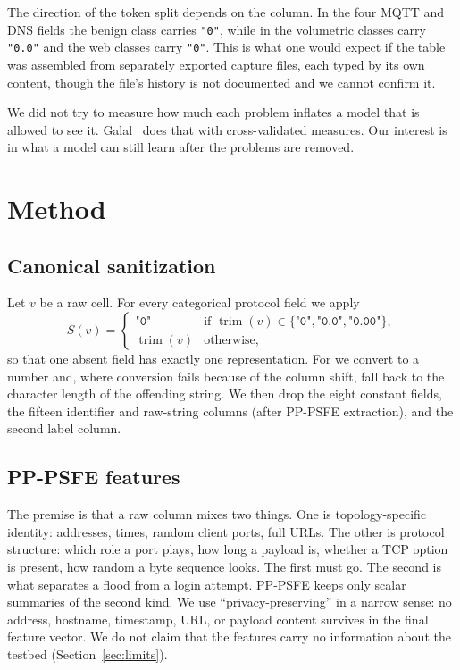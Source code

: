 \documentclass[journal]{IEEEtran}
\newcommand{\feat}[1]{\texttt{\detokenize{#1}}}
\newcommand{\zero}{\texttt{"0"}}
\newcommand{\zerof}{\texttt{"0.0"}}
\begin{document}
The direction of the token split depends on the column. In the four MQTT and DNS fields the benign class carries \zero{}, while in \feat{http.request.method} the volumetric classes carry \zerof{} and the web classes carry \zero{}. This is what one would expect if the table was assembled from separately exported capture files, each typed by its own content, though the file's history is not documented and we cannot confirm it.

We did not try to measure how much each problem inflates a model that is allowed to see it. Galal~\cite{galal2026} does that with cross-validated measures. Our interest is in what a model can still learn after the problems are removed.

\section{Method}\label{sec:method}
\subsection{Canonical sanitization}
Let $v$ be a raw cell. For every categorical protocol field we apply
\begin{equation}
S(v)=\begin{cases}\texttt{"0"} & \text{if } \operatorname{trim}(v)\in\{\texttt{"0"},\texttt{"0.0"},\texttt{"0.00"}\},\\ \operatorname{trim}(v) & \text{otherwise,}\end{cases}
\label{eq:canon}
\end{equation}
so that one absent field has exactly one representation. For \feat{dns.qry.name.len} we convert to a number and, where conversion fails because of the column shift, fall back to the character length of the offending string. We then drop the eight constant fields, the fifteen identifier and raw-string columns (after PP-PSFE extraction), and the second label column.

\subsection{PP-PSFE features}
The premise is that a raw column mixes two things. One is topology-specific identity: addresses, times, random client ports, full URLs. The other is protocol structure: which role a port plays, how long a payload is, whether a TCP option is present, how random a byte sequence looks. The first must go. The second is what separates a flood from a login attempt. PP-PSFE keeps only scalar summaries of the second kind. We use ``privacy-preserving'' in a narrow sense: no address, hostname, timestamp, URL, or payload content survives in the final feature vector. We do not claim that the features carry no information about the testbed (Section~\ref{sec:limits}).
\end{document}
